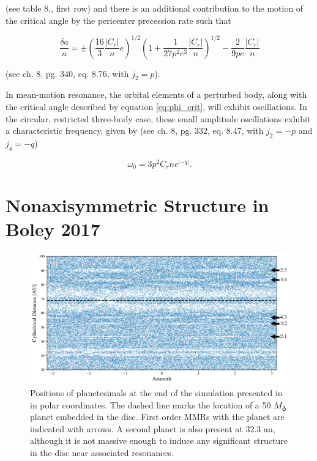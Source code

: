 \documentclass[fleqn,usenatbib]{mnras}
\begin{document}
\noindent (see \citet{1999ssd..book.....M} table 8., first row) and there is an additional contribution to the motion of the critical angle by the pericenter precession rate such that

\begin{equation}\label{eq:res_fo}
	\frac{\delta a}{a} = \pm \left(\frac{16}{3} \frac{\left| C_{r} \right|}{n} e \right)^{1/2} \left(  1 + \frac{1}{27 p^2 e^3} \frac{\left| C_{r} \right|}{n} 
	\right)^{1/2} - \frac{2}{9 p e}  \frac{\left| C_{r} \right|}{n}
\end{equation}

\noindent (see \citet{1999ssd..book.....M} ch. 8, pg. 340, eq. 8.76, with $j_{2} = p$).

In mean-motion resonance, the orbital elements of a perturbed body, along with the critical angle described by equation \ref{eq:phi_crit}, will exhibit oscillations. In the circular, 
restricted three-body case, these small amplitude oscillations exhibit a characteristic frequency, given by (see \citet{1999ssd..book.....M} ch. 8, pg. 332, eq. 8.47, with $j_{2} =-p$ and 
$j_{4} = -q$)

\begin{equation}\label{eq:lib_time}
	\omega_{0} = 3 p^{2} C_{r} n e^{\left| -q \right|}.
\end{equation}

\section{Nonaxisymmetric Structure in Boley 2017}\label{sec:boley_plot}

\begin{figure}
    \includegraphics[width=\textwidth]{figures/boley_rtheta.png}
    \caption{Positions of planetesimals at the end of the simulation presented in \citet{2017ApJ...850..103B} in polar coordinates. The dashed line marks the location of a 50 $M_{\earth}$ 
    planet embedded in the disc. First order MMRs with the planet are indicated with arrows. A second planet is also present at 32.3 au, although it is not massive enough to induce any 
    significant structure in the disc near associated resonances.\label{fig:boley_rtheta}}
\end{figure}
\end{document}
